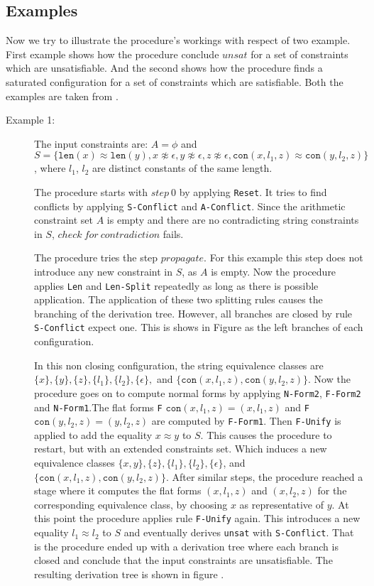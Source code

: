 \subsection{Examples}
Now we try to illustrate the procedure's workings with respect of two example. First example shows how the procedure conclude $unsat$ for a set of constraints which are unsatisfiable. And the second shows how the procedure finds a saturated configuration for a set of constraints which are satisfiable. Both the examples are taken from \cite{main-paper}.
\begin{description}			
	\item[Example 1:] The input constraints are: $ A = \phi$ and $S = \{ \texttt{len}(x) \approx
	\texttt{len}(y), x \not\approx \epsilon, y\not\approx \epsilon, z \not\approx \epsilon, \texttt{con}(x, l_1, z) \approx \texttt{con}(y, l_2, z)\}$, where $l_1$, $l_2$ are distinct constants of the same length.	

The procedure starts with $step\ 0$ by applying \texttt{Reset}. It tries to find conflicts by applying   \texttt{S-Conflict} and \texttt{A-Conflict}. Since the arithmetic constraint set $A$ is empty and there are no contradicting string constraints in $S$, $check\ for\ contradiction$ fails. 

The procedure tries the step $propagate$. For this example this step does not introduce any new constraint in $S$, as $A$ is empty. Now the procedure applies \texttt{Len} and \texttt{Len-Split} repeatedly as long as there is possible application. The application of these two splitting rules causes the branching of the derivation tree. However, all branches are closed by rule  \texttt{S-Conflict} expect one. This is shows in Figure as the left branches of each configuration. 

In this non closing configuration, the string equivalence classes are $\{x\}, \{y\}, \{z\}, \{l_1\}, \{l_2\}, \{\epsilon\},$ and $\{ \texttt{con}(x, l_1, z), \texttt{con}(y, l_2, z)\}$. Now the procedure goes on to compute normal forms by applying \texttt{N-Form2}, \texttt{F-Form2} and \texttt{N-Form1}.The flat forms  \texttt{F} $\texttt{con}(x, l_1, z) = (x, l_1, z)$ and \texttt{F} $\texttt{con}(y, l_2, z) = (y, l_2, z)$ are computed by \texttt{F-Form1}. Then \texttt{F-Unify} is applied to add the equality $x \approx y$ to $S$. This causes the procedure to restart, but with an extended constraints set. Which induces a new equivalence classes $ \{x, y\}, \{z\}, \{l_1\}, \{l_2\}, \{\epsilon\}$, and $\{\texttt{con}(x, l_1, z), \texttt{con}(y, l_2, z)\}$. After similar steps, the procedure reached a stage where it computes the flat forms $(x, l_1, z)$ and $(x, l_2, z)$ for the  corresponding equivalence class,
by choosing $x$ as representative of $y$. At this point the procedure applies rule \texttt{F-Unify} again. This introduces a new equality $l_1 \approx l_2$ to $S$ and eventually derives \texttt{unsat} with \texttt{S-Conflict}. That is the procedure ended up with a derivation tree where each branch is closed and conclude that the input constraints are unsatisfiable.  The resulting derivation tree is shown in figure .


\end{description}
